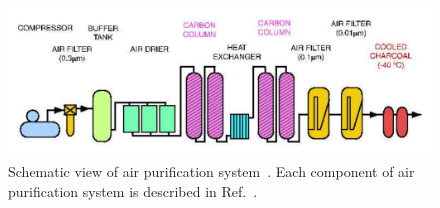 \begin{figure}[h]
	\centering
	\includegraphics[width=12cm]{Figures/SK/Air}
	\caption[Schematic view of air purification system]{\label{SK_Air} Schematic view of air purification system~\cite{2003Fukuda}. Each component of air purification system is described in Ref.~\cite{2015NakanoPhD}.}
\end{figure}


